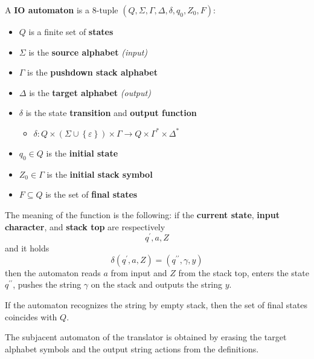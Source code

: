 \documentclass[english]{article}
\begin{document}
\begin{definition}[IO automaton]
  \label{def:pushdown-transducer}
  A \textbf{IO automaton} is a \(8\)-tuple \(\left( Q, \Sigma, \Gamma, \Delta, \delta, q_0, Z_0, F \right)\):

  \begin{itemize}
    \item \(Q\) is a finite set of \textbf{states}
    \item \(\Sigma\) is the \textbf{source alphabet}  \textit{(input)}
    \item \(\Gamma\) is the \textbf{pushdown stack alphabet}
    \item \(\Delta\) is the \textbf{target alphabet} \textit{(output)}
    \item \(\delta\) is the state \textbf{transition} and \textbf{output function}
          \begin{itemize}
            \item \(\delta : Q \times \left( \Sigma \cup \left\{ \varepsilon \right\} \right) \times \Gamma \rightarrow Q \times \Gamma^\ast \times \Delta^\ast\)
          \end{itemize}
    \item \(q_0 \in Q\) is the \textbf{initial state}
    \item \(Z_0 \in \Gamma\) is the \textbf{initial stack symbol}
    \item \(F \subseteq Q\) is the set of \textbf{final states}
  \end{itemize}
\end{definition}

The meaning of the function is the following: if the \textbf{current state}, \textbf{input character}, and \textbf{stack top} are respectively
\[ q^\prime, a, Z \]
and it holds
\[ \delta\left(q^\prime, a, Z\right) = \left( q^{\prime\prime}, \gamma, y \right) \]
then the automaton reads \(a\) from input and \(Z\) from the stack top, enters the state \(q^{\prime\prime}\), pushes the string \(\gamma\) on the stack and outputs the string \(y\).

If the automaton recognizes the string by empty stack, then the set of final states coincides with \(Q\).

The subjacent automaton of the translator is obtained by erasing the target alphabet symbols and the output string actions from the definitions.
\end{document}
